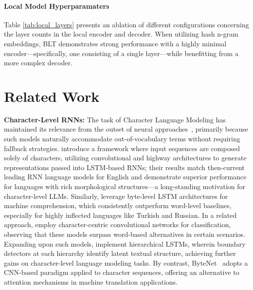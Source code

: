 \paragraph{Local Model Hyperparamaters} Table \ref{tab:local_layers} presents an ablation of different configurations concerning the layer counts in the local encoder and decoder. When utilizing hash n-gram embeddings, {\textsc BLT} demonstrates strong performance with a highly minimal encoder—specifically, one consisting of a single layer—while benefitting from a more complex decoder.

\section{Related Work}
\label{section:related_work}

\textbf{Character-Level RNNs:} The task of Character Language Modeling has maintained its relevance from the outset of neural approaches~\citep{sutskever2011generating,mikolov2012subword,graves2013generating}, primarily because such models naturally accommodate out-of-vocabulary terms without requiring fallback strategies. \cite{kim2016character} introduce a framework where input sequences are composed solely of characters, utilizing convolutional and highway architectures to generate representations passed into LSTM-based RNNs; their results match then-current leading RNN language models for English and demonstrate superior performance for languages with rich morphological structures—a long-standing motivation for character-level LLMs. Similarly, \cite{kenter2018byte} leverage byte-level LSTM architectures for machine comprehension, which consistently outperform word-level baselines, especially for highly inflected languages like Turkish and Russian. In a related approach, \cite{zhang2015character} employ character-centric convolutional networks for classification, observing that these models surpass word-based alternatives in certain scenarios. Expanding upon such models, \citet{chung2019hierarchical} implement hierarchical LSTMs, wherein boundary detectors at each hierarchy identify latent textual structure, achieving further gains on character-level language modeling tasks. By contrast, ByteNet~\cite{kalchbrenner2016neural} adopts a CNN-based paradigm applied to character sequences, offering an alternative to attention mechanisms in machine translation applications.

